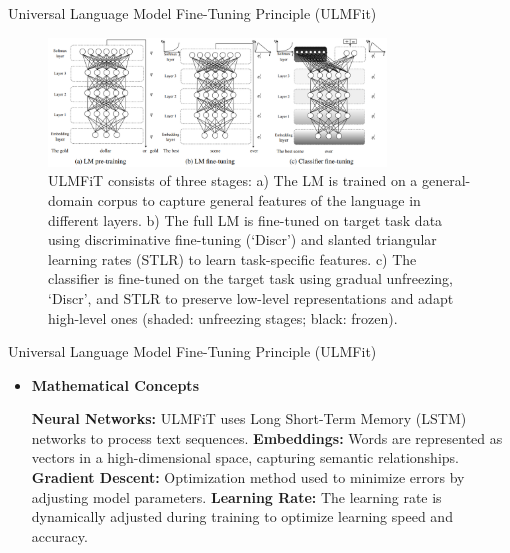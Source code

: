 \documentclass[serif, aspectratio=169]{beamer}
\begin{document}
\begin{frame}{Universal Language Model Fine-Tuning Principle (ULMFit)}
    \begin{figure}
        \centering
        \includegraphics[width=0.8\textwidth, height=0.7\textheight]{pic/ULMFit.PNG}
        \caption*{\fontsize{6}{7}\selectfont
        ULMFiT consists of three stages: a) The LM is trained on a general-domain corpus to capture
        general features of the language in different layers. b) The full LM is fine-tuned on target task data using
        discriminative fine-tuning (‘Discr’) and slanted triangular learning rates (STLR) to learn task-specific
        features. c) The classifier is fine-tuned on the target task using gradual unfreezing, ‘Discr’, and STLR to
        preserve low-level representations and adapt high-level ones (shaded: unfreezing stages; black: frozen).}
    \end{figure}
\end{frame}

\begin{frame}{Universal Language Model Fine-Tuning Principle (ULMFit)}
    \begin{itemize}
        \item
        \textbf{Mathematical Concepts}
        \vspace{0.3cm}
        \begin{outline}
            \1 \textbf{Neural Networks:} ULMFiT uses Long Short-Term Memory (LSTM) networks to process text sequences.
            \vspace{0.1cm}
            \1 \textbf{Embeddings:} Words are represented as vectors in a high-dimensional space, capturing semantic relationships.
            \vspace{0.1cm}
            \1 \textbf{Gradient Descent:} Optimization method used to minimize errors by adjusting model parameters.
            \vspace{0.1cm}
            \1 \textbf{Learning Rate:} The learning rate is dynamically adjusted during training to optimize learning speed and accuracy.
            \vspace{0.1cm}
        \end{outline}
    \end{itemize}
\end{frame}
\end{document}
